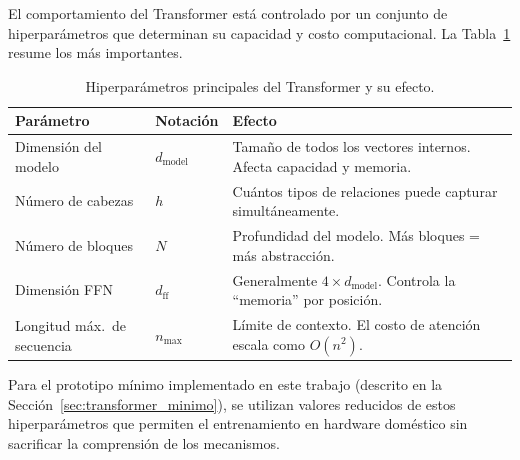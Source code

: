 El comportamiento del Transformer está controlado por un conjunto de
hiperparámetros que determinan su capacidad y costo computacional. La
Tabla~\ref{tab:hiperparametros_generales} resume los más importantes.

\begin{table}[H]
\centering
\caption{Hiperparámetros principales del Transformer y su efecto.}
\label{tab:hiperparametros_generales}
\begin{tabularx}{\textwidth}{llX}
\toprule
\textbf{Parámetro} & \textbf{Notación} & \textbf{Efecto} \\
\midrule
Dimensión del modelo   & $d_{\text{model}}$ & Tamaño de todos los vectores internos. Afecta capacidad y memoria. \\
Número de cabezas      & $h$               & Cuántos tipos de relaciones puede capturar simultáneamente. \\
Número de bloques      & $N$               & Profundidad del modelo. Más bloques = más abstracción. \\
Dimensión FFN          & $d_{\text{ff}}$   & Generalmente $4 \times d_{\text{model}}$. Controla la ``memoria'' por posición. \\
Longitud máx.\ de secuencia & $n_{\text{max}}$ & Límite de contexto. El costo de atención escala como $O(n^2)$. \\
\bottomrule
\end{tabularx}
\end{table}

Para el prototipo mínimo implementado en este trabajo (descrito en la
Sección~\ref{sec:transformer_minimo}), se utilizan valores reducidos de
estos hiperparámetros que permiten el entrenamiento en hardware doméstico
sin sacrificar la comprensión de los mecanismos.
